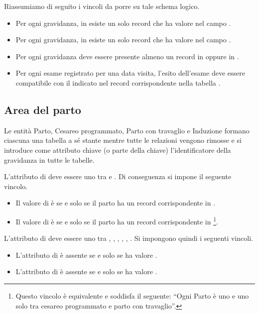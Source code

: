 Riassumiamo di seguito i vincoli da porre su tale schema logico.
\begin{itemize}
\item[\Con{}] Per ogni gravidanza, in  esiste un solo record che ha valore  nel campo .
\item[\Con{}] Per ogni gravidanza, in  esiste un solo record che ha valore  nel campo .
\item[\Con{}] Per ogni gravidanza deve essere presente almeno un record in  oppure in .
\item[\Con{}] Per ogni esame registrato per una data visita, l'esito dell'esame deve essere compatibile con il  indicato nel record corrispondente nella tabella .
\end{itemize}

\subsection{Area del parto}
\label{logicaldelivery}

Le entità Parto, Cesareo programmato, Parto con travaglio e Induzione formano ciascuna una tabella a sé stante mentre tutte le relazioni vengono rimosse e si introduce come attributo chiave (o parte della chiave) l'identificatore della gravidanza in tutte le tabelle.

L'attributo  di  deve essere uno tra  e .
Di conseguenza si impone il seguente vincolo.
\begin{itemize}
\item[\Con{}] Il valore di  è  se e solo se il parto ha un record corrispondente in .
\item[\Con{}] Il valore di  è  se e solo se il parto ha un record corrispondente in \footnote{
    Questo vincolo è equivalente e soddisfa il seguente: \enquote{Ogni Parto è uno e uno solo tra cesareo programmato e parto con travaglio}.
}.
\end{itemize}

L'attributo  di  deve essere uno tra , , , , , .
Si impongono quindi i seguenti vincoli.
\begin{itemize}
\item[\Con{}] L'attributo  di  è assente se e solo se  ha valore .
\item[\Con{}] L'attributo  di  è assente se e solo se  ha valore .
\end{itemize}

